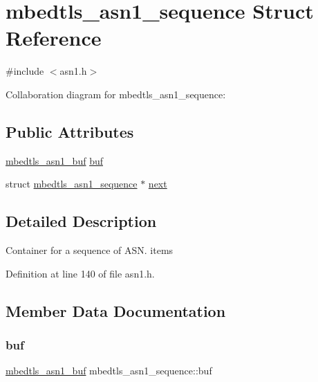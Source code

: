 \hypertarget{structmbedtls__asn1__sequence}{}\section{mbedtls\+\_\+asn1\+\_\+sequence Struct Reference}
\label{structmbedtls__asn1__sequence}


{\ttfamily \#include $<$asn1.\+h$>$}



Collaboration diagram for mbedtls\+\_\+asn1\+\_\+sequence\+:
\subsection*{Public Attributes}
\begin{DoxyCompactItemize}
\item 
\mbox{\hyperlink{structmbedtls__asn1__buf}{mbedtls\+\_\+asn1\+\_\+buf}} \mbox{\hyperlink{structmbedtls__asn1__sequence_a6ef535e31a30926169ee6877af393434}{buf}}
\item 
struct \mbox{\hyperlink{structmbedtls__asn1__sequence}{mbedtls\+\_\+asn1\+\_\+sequence}} $\ast$ \mbox{\hyperlink{structmbedtls__asn1__sequence_ac81969ddae2ace4340503530588d83e1}{next}}
\end{DoxyCompactItemize}


\subsection{Detailed Description}
Container for a sequence of A\+S\+N. items 

Definition at line 140 of file asn1.\+h.



\subsection{Member Data Documentation}
\mbox{\label{structmbedtls__asn1__sequence_a6ef535e31a30926169ee6877af393434}} 
\subsubsection{\texorpdfstring{buf}{buf}}
{\footnotesize\ttfamily \mbox{\hyperlink{structmbedtls__asn1__buf}{mbedtls\+\_\+asn1\+\_\+buf}} mbedtls\+\_\+asn1\+\_\+sequence\+::buf}

